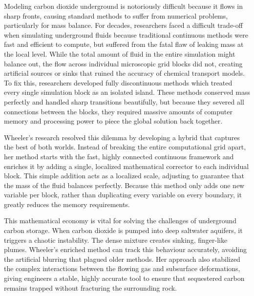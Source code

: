 Modeling carbon dioxide underground is notoriously difficult because it flows in sharp fronts, causing standard methods to suffer from numerical problems, particularly for mass balance. For decades, researchers faced a difficult trade-off when simulating underground fluids because traditional continuous methods were fast and efficient to compute, but suffered from the fatal flaw of leaking mass at the local level. While the total amount of fluid in the entire simulation might balance out, the flow across individual microscopic grid blocks did not, creating artificial sources or sinks that ruined the accuracy of chemical transport models. To fix this, researchers developed fully discontinuous methods which treated every single simulation block as an isolated island. These methods conserved mass perfectly and handled sharp transitions beautifully, but because they severed all connections between the blocks, they required massive amounts of computer memory and processing power to piece the global solution back together.

Wheeler’s research resolved this dilemma by developing a hybrid that captures the best of both worlds. Instead of breaking the entire computational grid apart, her method starts with the fast, highly connected continuous framework and enriches it by adding a single, localized mathematical corrector to each individual block. This simple addition acts as a localized scale, adjusting to guarantee that the mass of the fluid balances perfectly. Because this method only adds one new variable per block, rather than duplicating every variable on every boundary, it greatly reduces the memory requirements.

This mathematical economy is vital for solving the challenges of underground carbon storage. When carbon dioxide is pumped into deep saltwater aquifers, it triggers a chaotic instability. The dense mixture creates sinking, finger-like plumes. Wheeler’s enriched method can track this behaviour accurately, avoiding the artificial blurring that plagued older methods. Her approach also stabilized the complex interactions between the flowing gas and subsurface deformations, giving engineers a stable, highly accurate tool to ensure that sequestered carbon remains trapped without fracturing the surrounding rock.

